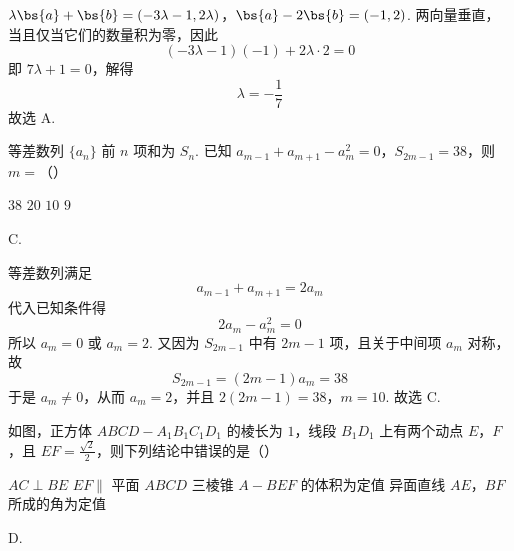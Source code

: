 \begin{solution}
\(\lambda\bs{a}+\bs{b}=(-3\lambda-1,2\lambda)\)，\(\bs{a}-2\bs{b}=(-1,2)\).
两向量垂直，当且仅当它们的数量积为零，因此
\[
(-3\lambda-1)(-1)+2\lambda\cdot2=0
\]
即 \(7\lambda+1=0\)，解得
\[
\lambda=-\frac17
\]
故选 A.
\end{solution}

\begin{problem}
等差数列 \(\{a_{n}\}\) 前 \(n\) 项和为 \(S_{n}\). 已知 \(a_{m-1} + a_{m+1} - a_{m}^{2} = 0\)，\(S_{2m-1} = 38\)，则 \(m =\)（\quad）

\choices
    {\(38\)}
    {\(20\)}
    {\(10\)}
    {\(9\)}
\end{problem}

\begin{answer}
C.
\end{answer}

\begin{solution}
等差数列满足
\[
a_{m-1}+a_{m+1}=2a_{m}
\]
代入已知条件得
\[
2a_{m}-a_{m}^{2}=0
\]
所以 \(a_{m}=0\) 或 \(a_{m}=2\). 又因为 \(S_{2m-1}\) 中有 \(2m-1\) 项，且关于中间项 \(a_m\) 对称，故
\[
S_{2m-1}=(2m-1)a_m=38
\]
于是 \(a_m\ne0\)，从而 \(a_m=2\)，并且
\(2(2m-1)=38\)，\(m=10\).
故选 C.
\end{solution}

\begin{problem}
如图，正方体 \( ABCD - A_{1}B_{1}C_{1}D_{1} \) 的棱长为 \(1\)，线段 \(B_{1}D_{1}\) 上有两个动点 \(E\)，\(F\)，且 \( EF = \frac{\sqrt{2}}{2} \)，则下列结论中错误的是（\quad）


\choices
    {\(AC \perp BE\)}
    {\(EF \parallel\) 平面 \(ABCD\)}
    {三棱锥 \(A - BEF\) 的体积为定值}
    {异面直线 \(AE\)，\(BF\) 所成的角为定值}
\end{problem}

\begin{answer}
D.
\end{answer}


